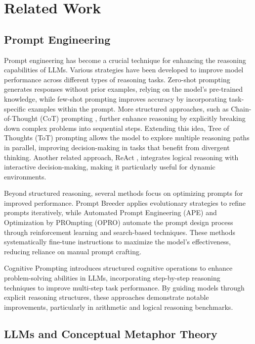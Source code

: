 \section{Related Work}
\label{sec:related}

\subsection{Prompt Engineering}

Prompt engineering has become a crucial technique for enhancing the reasoning capabilities of LLMs. Various strategies have been developed to improve model performance across different types of reasoning tasks. Zero-shot prompting generates responses without prior examples, relying on the model’s pre-trained knowledge, while few-shot prompting \cite{brown2020language} improves accuracy by incorporating task-specific examples within the prompt. More structured approaches, such as Chain-of-Thought (CoT) prompting \cite{wei2022chain}, further enhance reasoning by explicitly breaking down complex problems into sequential steps. Extending this idea, Tree of Thoughts (ToT) prompting \cite{tree} allows the model to explore multiple reasoning paths in parallel, improving decision-making in tasks that benefit from divergent thinking. Another related approach, ReAct \cite{yao2022react}, integrates logical reasoning with interactive decision-making, making it particularly useful for dynamic environments.

Beyond structured reasoning, several methods focus on optimizing prompts for improved performance. Prompt Breeder \cite{promptbreeder2022} applies evolutionary strategies to refine prompts iteratively, while Automated Prompt Engineering (APE) \cite{ape} and Optimization by PROmpting (OPRO) \cite{opro} automate the prompt design process through reinforcement learning and search-based techniques. These methods systematically fine-tune instructions to maximize the model's effectiveness, reducing reliance on manual prompt crafting. 

Cognitive Prompting \cite{cp} introduces structured cognitive operations to enhance problem-solving abilities in LLMs, incorporating step-by-step reasoning techniques to improve multi-step task performance. By guiding models through explicit reasoning structures, these approaches demonstrate notable improvements, particularly in arithmetic and logical reasoning benchmarks.
 
\subsection{LLMs and Conceptual Metaphor Theory}

